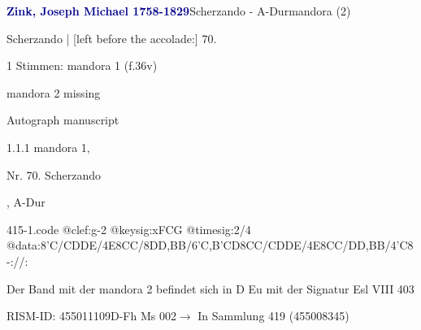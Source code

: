 \documentclass[twocolumn]{book}
\begin{document}
\par \vspace{7pt} \textcolor{darkblue}{\textbf{Zink, Joseph Michael  1758-1829}}\hfillplus{\textbf{[415]}}\newline Scherzando - A-Dur\newline mandora (2)
\par \begin{itshape}[f.36v, at left:] Scherzando | [left before the accolade:] 70.\end{itshape} 
\par \textcolor{darkblue}{}  1 Stimmen: mandora 1  (f.36v)\newline \begin{small} mandora 2 missing\end{small} \newline Autograph manuscript
\par 1.1.1  mandora 1, \begin{itshape}Nr. 70. Scherzando\end{itshape}, A-Dur  
\begin{filecontents*}{415-1.code}
@clef:g-2
@keysig:xFCG
@timesig:2/4
@data:8'C/CDDE/4E{8CC}/8DD,BB/{6'C,B'CD}{8CC}/CDDE/4E{8CC}/DD,BB/4'C8-://:
\end{filecontents*}
\newline
%
\par Der Band mit der mandora 2 befindet sich in D Eu mit der Signatur Esl VIII 403
\par RISM-ID: 455011109\newline D-Fh  Ms 002\newline $\rightarrow$ In Sammlung 419 (455008345)
      
\end{document}
